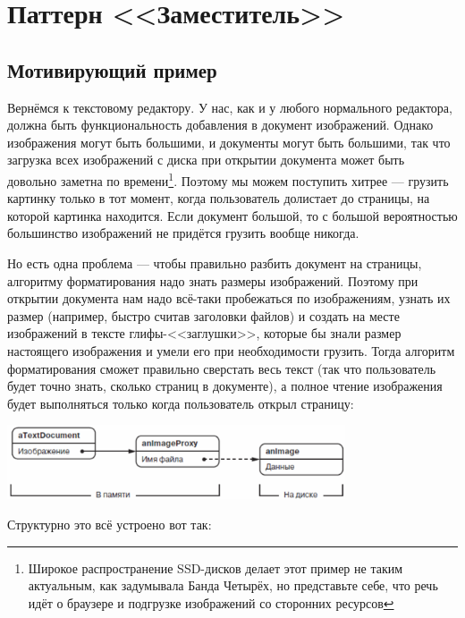 \documentclass{../mcstext}
\begin{document}
\section{Паттерн <<Заместитель>>}

\subsection{Мотивирующий пример}

Вернёмся к текстовому редактору. У нас, как и у любого нормального редактора, должна быть функциональность добавления в документ изображений. Однако изображения могут быть большими, и документы могут быть большими, так что загрузка всех изображений с диска при открытии документа может быть довольно заметна по времени\footnote{Широкое распространение SSD-дисков делает этот пример не таким актуальным, как задумывала Банда Четырёх, но представьте себе, что речь идёт о браузере и подгрузке изображений со сторонних ресурсов}. Поэтому мы можем поступить хитрее --- грузить картинку только в тот момент, когда пользователь долистает до страницы, на которой картинка находится. Если документ большой, то с большой вероятностью большинство изображений не придётся грузить вообще никогда.

Но есть одна проблема --- чтобы правильно разбить документ на страницы, алгоритму форматирования надо знать размеры изображений. Поэтому при открытии документа нам надо всё-таки пробежаться по изображениям, узнать их размер (например, быстро считав заголовки файлов) и создать на месте изображений в тексте глифы-<<заглушки>>, которые бы знали размер настоящего изображения и умели его при необходимости грузить. Тогда алгоритм форматирования сможет правильно сверстать весь текст (так что пользователь будет точно знать, сколько страниц в документе), а полное чтение изображения будет выполняться только когда пользователь открыл страницу:

\begin{center}
    \includegraphics[width=0.75\textwidth]{proxyExample.png}
\end{center}

Структурно это всё устроено вот так:
\end{document}
